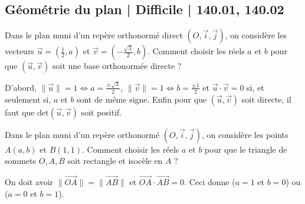 \subsection{Géométrie du plan | Difficile | 140.01, 140.02}


\begin{question}
Dans le plan muni d'un repère orthonormé direct $(O,\vec{i},\vec{j})$, on considère les vecteurs $\displaystyle \vec{u}=\left(\frac{1}{2},a\right)$ et $\displaystyle \vec{v}=\left(-\frac{\sqrt{3}}{2},b\right)$. Comment choisir les réels $a$ et $b$ pour que $(\vec{u},\vec{v})$ soit une base orthonormée directe ?
\begin{answers}  
\end{answers}
\begin{explanations}
D'abord, $\displaystyle \|\vec{u}\|=1\Leftrightarrow a=\frac{\pm \sqrt{3}}{2}$, $\displaystyle \|\vec{v}\|=1\Leftrightarrow b=\frac{\pm 1}{2}$ et $\vec{u}\cdot\vec{v}=0$ si, et seulement si, $a$ et $b$ sont de même signe. Enfin pour que $(\vec{u},\vec{v})$ soit directe, il faut que $\mbox{det}(\vec{u},\vec{v})$ soit positif.
\end{explanations}
\end{question}



\begin{question}
Dans le plan muni d'un repère orthonormé $(O,\vec{i},\vec{j})$, on considère les points $\displaystyle A(a,b)$ et $\displaystyle B(1,1)$. Comment choisir les réels $a$ et $b$ pour que le triangle de sommets $O,A,B$ soit rectangle et isocèle en $A$ ?
\begin{answers}  
\end{answers}
\begin{explanations}
On doit avoir $\displaystyle \|\overrightarrow{OA}\|=\|\overrightarrow{AB}\|$ et $\overrightarrow{OA}\cdot\overrightarrow{AB}=0$. Ceci donne ($a=1$ et $b=0$) ou ($a=0$ et $b=1$).
\end{explanations}
\end{question}



